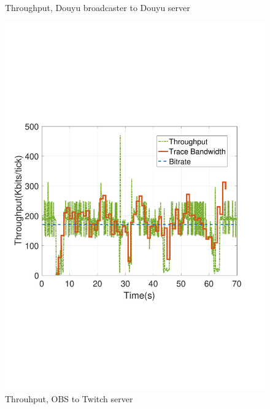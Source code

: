\begin{figure}[htb]
  \caption{Throughput, Douyu broadcaster to Douyu server}
  \label{fig:douyu}
\endminipage\hfill
{}%
  \includegraphics[width=0.8\linewidth]{fig/obs_twitch.pdf}
  \caption{Throuhput, OBS to Twitch server}
  \label{fig:obs-twitch}
\endminipage
\end{figure}

